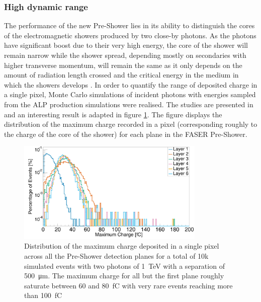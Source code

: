 		\subsubsection{High dynamic range}
		The performance of the new Pre-Shower lies in its ability to distinguish the cores of the electromagnetic showers produced by two close-by photons. As the photons have significant boost due to their very high energy, the core of the shower will remain narrow while the shower spread, depending mostly on secondaries with higher transverse momentum, will remain the same as it only depends on the amount of radiation length crossed and the critical energy in the medium in which the showers develops \cite{PDG}. In order to quantify the range of deposited charge in a single pixel, Monte Carlo simulations of incident photons with energies sampled from the ALP production simulations were realised. The studies are presented in \cite{Kotitsa_thesis} and an interesting result is adapted in figure \ref{im:charge_per_plane_FASER}. The figure displays the distribution of the maximum charge recorded in a pixel (corresponding roughly to the charge of the core of the shower) for each plane in the FASER Pre-Shower.
		
		\begin{figure}[h]
			\centering
			\includegraphics[width=0.8\textwidth]{files/charge_per_plane_FASER}
			\caption{Distribution of the maximum charge deposited in a single pixel across all the Pre-Shower detection planes for a total of 10k simulated events with two photons of \SI{1}{\tera\electronvolt} with a separation of \SI{500}{\micro\meter}. The maximum charge for all but the first plane roughly saturate between 60 and \SI{80}{\femto\coulomb} with very rare events reaching more than \SI{100}{\femto\coulomb}}
			\label{im:charge_per_plane_FASER}
		\end{figure}
		
